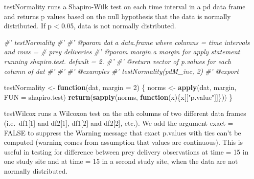 \documentclass[]{article}
\newenvironment{Shaded}{\begin{snugshade}}{\end{snugshade}}
\newcommand{\CommentTok}[1]{\textcolor[rgb]{0.56,0.35,0.01}{\textit{#1}}}
\newcommand{\ControlFlowTok}[1]{\textcolor[rgb]{0.13,0.29,0.53}{\textbf{#1}}}
\newcommand{\DataTypeTok}[1]{\textcolor[rgb]{0.13,0.29,0.53}{#1}}
\newcommand{\DecValTok}[1]{\textcolor[rgb]{0.00,0.00,0.81}{#1}}
\newcommand{\KeywordTok}[1]{\textcolor[rgb]{0.13,0.29,0.53}{\textbf{#1}}}
\newcommand{\NormalTok}[1]{#1}
\newcommand{\OperatorTok}[1]{\textcolor[rgb]{0.81,0.36,0.00}{\textbf{#1}}}
\newcommand{\OtherTok}[1]{\textcolor[rgb]{0.56,0.35,0.01}{#1}}
\newcommand{\StringTok}[1]{\textcolor[rgb]{0.31,0.60,0.02}{#1}}
\begin{document}
testNormality runs a Shapiro-Wilk test on each time interval in a pd
data frame and returns p values based on the null hypothesis that the
data is normally distributed. If p \textless{} 0.05, data is not
normally distributed.

\begin{Shaded}
\begin{Highlighting}[]
\CommentTok{#' testNormality}
\CommentTok{#' }
\CommentTok{#' @param dat a data.frame where columns = time intervals and rows = # prey deliveries}
\CommentTok{#' @param margin.a margin for apply statement running shapiro.test. default = 2.}
\CommentTok{#'}
\CommentTok{#' @return vector of p.values for each column of dat}
\CommentTok{#' }
\CommentTok{#'}
\CommentTok{#' @examples}
\CommentTok{#'    testNormality(pdM_inc, 2)}
\CommentTok{#' @export}

\NormalTok{testNormality <-}\StringTok{ }\ControlFlowTok{function}\NormalTok{(dat, }\DataTypeTok{margin =} \DecValTok{2}\NormalTok{) \{}
\NormalTok{  norms <-}\StringTok{ }\KeywordTok{apply}\NormalTok{(dat, margin, }\DataTypeTok{FUN =}\NormalTok{ shapiro.test)}
  \KeywordTok{return}\NormalTok{(}\KeywordTok{sapply}\NormalTok{(norms, }\ControlFlowTok{function}\NormalTok{(x)\{x[[}\StringTok{"p.value"}\NormalTok{]]\}))}
\NormalTok{\}}
\end{Highlighting}
\end{Shaded}

testWilcox runs a Wilcoxon test on the nth columns of two different data
frames (i.e.~df1{[}1{]} and df2{[}1{]}, df1{[}2{]} and df2{[}2{]},
etc.). We add the argument exact = FALSE to suppress the Warning message
that exact p.values with ties can't be computed (warning comes from
assumption that values are continuous). This is useful in testing for
difference between prey delivery observations at time = 15 in one study
site and at time = 15 in a second study site, when the data are not
normally distributed.

\begin{Shaded}
\end{Shaded}
\end{document}
